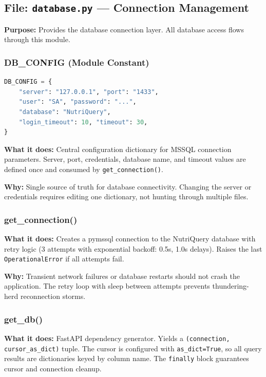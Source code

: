 \documentclass[12pt,a4paper]{article}
\begin{document}
\subsection{File: \texttt{database.py} — Connection Management}

\textbf{Purpose:} Provides the database connection layer. All database access flows through this module.

\subsubsection{DB\_CONFIG (Module Constant)}
\begin{lstlisting}[language=Python, caption=Database configuration dictionary]
DB_CONFIG = {
    "server": "127.0.0.1", "port": "1433",
    "user": "SA", "password": "...",
    "database": "NutriQuery",
    "login_timeout": 10, "timeout": 30,
}
\end{lstlisting}

\textbf{What it does:} Central configuration dictionary for MSSQL connection parameters. Server, port, credentials, database name, and timeout values are defined once and consumed by \texttt{get\_connection()}.

\textbf{Why:} Single source of truth for database connectivity. Changing the server or credentials requires editing one dictionary, not hunting through multiple files.

\subsubsection{get\_connection()}
\textbf{What it does:} Creates a pymssql connection to the NutriQuery database with retry logic (3 attempts with exponential backoff: 0.5s, 1.0s delays). Raises the last \texttt{OperationalError} if all attempts fail.

\textbf{Why:} Transient network failures or database restarts should not crash the application. The retry loop with sleep between attempts prevents thundering-herd reconnection storms.

\subsubsection{get\_db()}
\textbf{What it does:} FastAPI dependency generator. Yields a \texttt{(connection, cursor\_as\_dict)} tuple. The cursor is configured with \texttt{as\_dict=True}, so all query results are dictionaries keyed by column name. The \texttt{finally} block guarantees cursor and connection cleanup.
\end{document}
